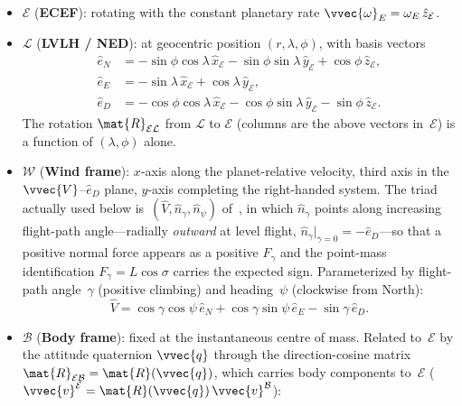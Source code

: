 \begin{itemize}
  \item $\mathcal{E}$ (\textbf{ECEF}): rotating with the constant
    planetary rate $\vvec{\omega}_E = \omega_E\,\hat{z}_{\mathcal{E}}$.

  \item $\mathcal{L}$ (\textbf{LVLH / NED}): at geocentric position
    $(r,\lambda,\phi)$, with basis vectors
    \begin{align*}
      \hat{e}_N &= -\sin\phi\cos\lambda\,\hat{x}_{\mathcal{E}}
                    -\sin\phi\sin\lambda\,\hat{y}_{\mathcal{E}}
                    +\cos\phi\,\hat{z}_{\mathcal{E}},\\
      \hat{e}_E &= -\sin\lambda\,\hat{x}_{\mathcal{E}}
                    +\cos\lambda\,\hat{y}_{\mathcal{E}},\\
      \hat{e}_D &= -\cos\phi\cos\lambda\,\hat{x}_{\mathcal{E}}
                    -\cos\phi\sin\lambda\,\hat{y}_{\mathcal{E}}
                    -\sin\phi\,\hat{z}_{\mathcal{E}}.
    \end{align*}
    The rotation $\mat{R}_{\mathcal{E}\mathcal{L}}$ from $\mathcal{L}$ to
    $\mathcal{E}$ (columns are the above vectors in~$\mathcal{E}$) is a
    function of $(\lambda,\phi)$ alone.

  \item $\mathcal{W}$ (\textbf{Wind frame}): $x$-axis along the
    planet-relative velocity, third axis in the
    $\vvec{V}$--$\hat{e}_D$ plane, $y$-axis completing the right-handed
    system. The triad actually used below
    is~$(\hat{V},\hat{n}_\gamma,\hat{n}_\psi)$
    of~, in which $\hat{n}_\gamma$ points along
    increasing flight-path angle---radially \emph{outward} at level
    flight, $\hat{n}_\gamma|_{\gamma=0} = -\hat{e}_D$---so that a positive
    normal force appears as a positive $F_\gamma$ and the point-mass
    identification $F_\gamma = L\cos\sigma$ carries the expected sign.
    Parameterized by
    flight-path angle~$\gamma$ (positive climbing) and
    heading~$\psi$ (clockwise from North):
    \[
      \hat{V} = \cos\gamma\cos\psi\,\hat{e}_N
              + \cos\gamma\sin\psi\,\hat{e}_E
              - \sin\gamma\,\hat{e}_D.
    \]

  \item $\mathcal{B}$ (\textbf{Body frame}): fixed at the instantaneous
    centre of mass. Related to~$\mathcal{E}$ by the attitude quaternion
    $\vvec{q}$ through the direction-cosine matrix
    $\mat{R}_{\mathcal{E}\mathcal{B}} = \mat{R}(\vvec{q})$, which carries
    body components to~$\mathcal{E}$
    ($\vvec{v}^{\mathcal{E}} = \mat{R}(\vvec{q})\,\vvec{v}^{\mathcal{B}}$):
\end{itemize}
